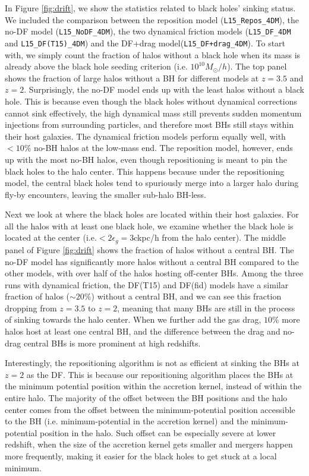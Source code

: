 In Figure \ref{fig:drift}, we show the statistics related to black holes' sinking status. We included the comparison between the reposition model (\texttt{L15\_Repos\_4DM}), the no-DF model (\texttt{L15\_NoDF\_4DM}), the two dynamical friction models (\texttt{L15\_DF\_4DM} and \texttt{L15\_DF(T15)\_4DM}) and the DF+drag model(\texttt{L15\_DF+drag\_4DM}). To start with, we simply count the fraction of halos without a black hole when its mass is already above the black hole seeding criterion (i.e. $10^{10}M_{\odot}/h$). The top panel shows the fraction of large halos without a BH for different models at $z=3.5$ and $z=2$. Surprisingly, the no-DF model ends up with the least halos without a black hole. This is because even though the black holes without dynamical corrections cannot sink effectively, the high dynamical mass still prevents sudden momentum injections from surrounding particles, and therefore most BHs still stays within their host galaxies. The dynamical friction models perform equally well, with $<10\%$ no-BH halos at the low-mass end. The reposition model, however, ends up with the most no-BH halos, even though repositioning is meant to pin the black holes to the halo center. This happens because under the repositioning model, the central black holes tend to spuriously merge into a larger halo during fly-by encounters, leaving the smaller sub-halo BH-less.

Next we look at where the black holes are located within their host galaxies. For all the halos with at least one black hole, we examine whether the black hole is located at the center (i.e.$<2\epsilon_g = 3$ckpc/h from the halo center). The middle panel of Figure \ref{fig:drift} shows the fraction of halos without a central BH. The no-DF model has significantly more halos without a central BH compared to the other models, with over half of the halos hosting off-center BHs. Among the three runs with dynamical friction, the DF(T15) and DF(fid) models have a similar fraction of halos ($\sim 20\%$) without a central BH, and we can see this fraction dropping from $z=3.5$ to $z=2$, meaning that many BHs are still in the process of sinking towards the halo center. When we further add the gas drag, $10\%$ more halos host at least one central BH, and the difference between the drag and no-drag central BHs is more prominent at high redshifts. 

Interestingly, the repositioning algorithm is not as efficient at sinking the BHs at $z=2$ as the DF. This is because our repositioning algorithm places the BHs at the minimum potential position within the accretion kernel, instead of within the entire halo. The majority of the offset between the BH positions and the halo center comes from the offset between the minimum-potential position accessible to the BH (i.e. minimum-potential in the accretion kernel) and the minimum-potential position in the halo. Such offset can be especially severe at lower redshift, when the size of the accretion kernel gets smaller and mergers happen more frequently, making it easier for the black holes to get stuck at a local minimum.



